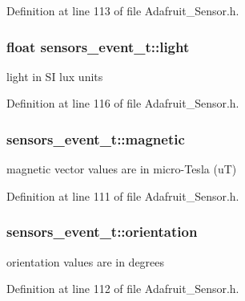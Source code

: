 Definition at line 113 of file Adafruit\+\_\+\+Sensor.\+h.

\subsubsection[{\texorpdfstring{light}{light}}]{\setlength{\rightskip}{0pt plus 5cm}float sensors\+\_\+event\+\_\+t\+::light}\hypertarget{structsensors__event__t_adefd2ce2da44e4449ef7cadeaecc6cfd}{}\label{structsensors__event__t_adefd2ce2da44e4449ef7cadeaecc6cfd}
light in SI lux units 

Definition at line 116 of file Adafruit\+\_\+\+Sensor.\+h.

\subsubsection[{\texorpdfstring{magnetic}{magnetic}}]{ sensors\+\_\+event\+\_\+t\+::magnetic}\hypertarget{structsensors__event__t_aa634d41a024e1cacdceecf85ec326698}{}\label{structsensors__event__t_aa634d41a024e1cacdceecf85ec326698}
magnetic vector values are in micro-\/\+Tesla (uT) 

Definition at line 111 of file Adafruit\+\_\+\+Sensor.\+h.

\subsubsection[{\texorpdfstring{orientation}{orientation}}]{ sensors\+\_\+event\+\_\+t\+::orientation}\hypertarget{structsensors__event__t_acbe3c50a256fa9423bc9e3a6e0da7ebf}{}\label{structsensors__event__t_acbe3c50a256fa9423bc9e3a6e0da7ebf}
orientation values are in degrees 

Definition at line 112 of file Adafruit\+\_\+\+Sensor.\+h.

